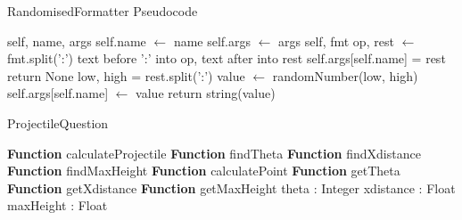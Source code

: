 \begin{algorithm}[H]
	\label{randomformatterps}
	\caption{RandomisedFormatter Pseudocode}
	\begin{algorithmic}[1]
		 {self, name, args}
		\State self.name $\gets$ name
		\State self.args $\gets$ args
		\EndFunction
		 {self, fmt}
		\State op, rest $\gets$ fmt.split(':') \Comment text before ':' into op, text after into  rest
		\State self.args[self.name] = rest
		\State return None
		\EndIf
		\State low, high = rest.split(':')
		\State value $\gets$ randomNumber(low, high)
		\State self.args[self.name] $\gets$ value
		\State return string(value)
		\EndIf
		\EndFunction
		\EndProcedure
	\end{algorithmic}
\end{algorithm}
\begin{algorithm}[H]\label{ProjectileQuestion}
	\caption{ProjectileQuestion}
	\begin{algorithmic}[1]
		\public
		\State \textbf{Function} calculateProjectile
		\State \textbf{Function} findTheta
		\State \textbf{Function} findXdistance
		\State \textbf{Function} findMaxHeight
		\State \textbf{Function} calculatePoint
		\State \textbf{Function} getTheta
		\State \textbf{Function} getXdistance
		\State \textbf{Function} getMaxHeight
		\endpublic
		\private
		\State theta : Integer
		\State xdistance : Float
		\State maxHeight : Float
		\endprivate
		\EndProcedure
	\end{algorithmic}
\end{algorithm}
